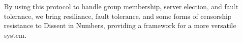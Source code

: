   By using this protocol to handle group membership, server election, and fault
  tolerance, we bring resiliance, fault tolerance, and some forms of censorship
  resistance to Dissent in Numbers, providing a framework for a more versatile
  system.

%
%
